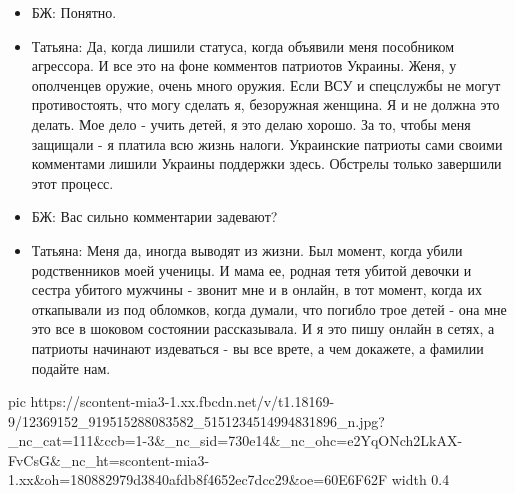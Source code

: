 \begin{itemize}
\item БЖ: Понятно.
\item Татьяна: Да, когда лишили статуса, когда объявили меня пособником агрессора. И все это на фоне комментов патриотов Украины. Женя, у ополченцев оружие, очень много оружия. Если ВСУ и спецслужбы не могут противостоять, что могу сделать я, безоружная женщина. Я и не должна это делать. Мое дело - учить детей, я это делаю хорошо. За то, чтобы меня защищали - я платила всю жизнь налоги. Украинские патриоты сами своими комментами лишили Украины поддержки здесь. Обстрелы только завершили этот процесс.
\item БЖ: Вас сильно комментарии задевают?

\item Татьяна: Меня да, иногда выводят из жизни. Был момент, когда убили
родственников моей ученицы. И мама ее, родная тетя убитой девочки и сестра
убитого мужчины - звонит мне и в онлайн, в тот момент, когда их откапывали из
под обломков, когда думали, что погибло трое детей - она мне это все в шоковом
состоянии рассказывала. И я это пишу онлайн в сетях, а патриоты начинают
издеваться - вы все врете, а чем докажете, а фамилии подайте нам.

\end{itemize}

\ifcmt
  pic https://scontent-mia3-1.xx.fbcdn.net/v/t1.18169-9/12369152_919515288083582_5151234514994831896_n.jpg?_nc_cat=111&ccb=1-3&_nc_sid=730e14&_nc_ohc=e2YqONch2LkAX-FvCsG&_nc_ht=scontent-mia3-1.xx&oh=180882979d3840afdb8f4652ec7dcc29&oe=60E6F62F
  width 0.4
\fi
